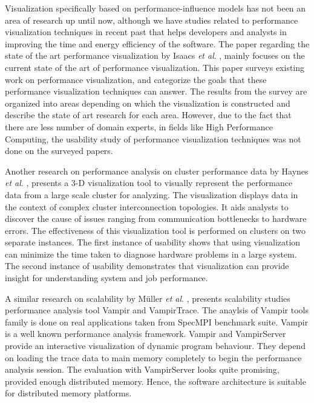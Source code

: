 \label{relatedwork}

Visualization specifically based on performance-influence models has not been an area of research up until  now, although we have studies related to performance visualization techniques in recent past that helps developers and analysts in improving the time and energy efficiency of the software. The paper regarding the state of the art performance visualization by Isaacs \textit{et al}. \cite{DBLP:conf/vissym/IsaacsGJGB0HB14},  mainly focuses on the current state of the art of performance visualization. This paper surveys existing work on performance visualization, and categorize the goals that these performance visualization techniques can answer. The results from the survey are organized into areas depending on which the visualization is constructed and describe the state of art research for each area. However, due to the fact that there are less number of domain experts, in fields like High Performance Computing, the usability study of performance visualization techniques was not done on the surveyed papers. 

Another research on performance analysis on cluster performance data by Haynes \textit{et al}. \cite{DBLP:conf/cluster/HaynesCR01}, presents a 3-D visualization tool to visually represent the performance data from a large scale cluster for analyzing. The visualization displays data in the context of complex cluster interconnection topologies. It aids analysts to discover the cause of issues ranging from communication bottlenecks to hardware errors. The effectiveness of this visualization tool is performed on clusters on two separate instances. The first instance of usability  shows that using visualization can minimize the time taken to diagnose hardware problems in a large system. The second instance of usability demonstrates that visualization can provide insight for understanding system and job performance.

A similar research on scalability by M{\"{u}}ller \textit{et al}. \cite{DBLP:conf/parco/MullerKJLBMN07}, presents scalability studies performance analysis tool Vampir and VampirTrace. The anaylsis of Vampir tools family is done on real applications taken from SpecMPI benchmark suite. Vampir is a well known performance analysis framework. Vampir and VampirServer provide an interactive visualization of dynamic program behaviour. They depend on loading the trace data to main memory completely to begin the performance analysis session. The evaluation with VampirServer looks quite promising, provided enough distributed memory. Hence, the software architecture is suitable for distributed memory platforms.

